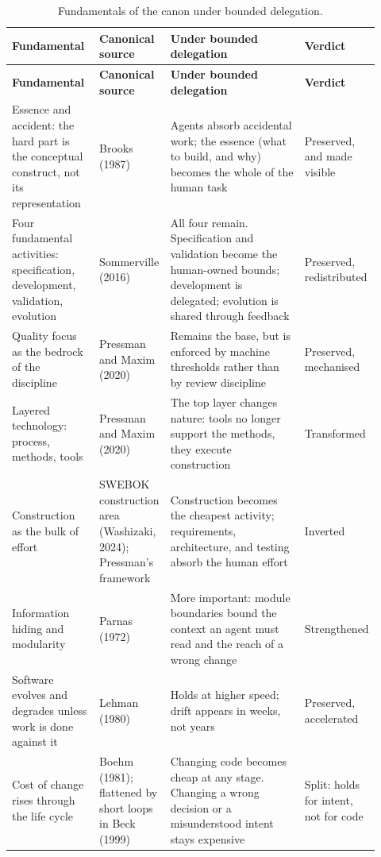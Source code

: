 \documentclass[11pt]{article}
\begin{document}
\small
\begin{longtable}{p{0.24\linewidth}p{0.17\linewidth}p{0.4\linewidth}p{0.11\linewidth}}
\caption{Fundamentals of the canon under bounded delegation.}
\label{tab:canon}\\
\toprule
\textbf{Fundamental} & \textbf{Canonical source} & \textbf{Under bounded delegation} & \textbf{Verdict} \\
\midrule
\endfirsthead
\toprule
\textbf{Fundamental} & \textbf{Canonical source} & \textbf{Under bounded delegation} & \textbf{Verdict} \\
\midrule
\endhead
Essence and accident: the hard part is the conceptual construct, not its representation & Brooks (1987) & Agents absorb accidental work; the essence (what to build, and why) becomes the whole of the human task & Preserved, and made visible \\
Four fundamental activities: specification, development, validation, evolution & Sommerville (2016) & All four remain. Specification and validation become the human-owned bounds; development is delegated; evolution is shared through feedback & Preserved, redistributed \\
Quality focus as the bedrock of the discipline & Pressman and Maxim (2020) & Remains the base, but is enforced by machine thresholds rather than by review discipline & Preserved, mechanised \\
Layered technology: process, methods, tools & Pressman and Maxim (2020) & The top layer changes nature: tools no longer support the methods, they execute construction & Transformed \\
Construction as the bulk of effort & SWEBOK construction area (Washizaki, 2024); Pressman's framework & Construction becomes the cheapest activity; requirements, architecture, and testing absorb the human effort & Inverted \\
Information hiding and modularity & Parnas (1972) & More important: module boundaries bound the context an agent must read and the reach of a wrong change & Strengthened \\
Software evolves and degrades unless work is done against it & Lehman (1980) & Holds at higher speed; drift appears in weeks, not years & Preserved, accelerated \\
Cost of change rises through the life cycle & Boehm (1981); flattened by short loops in Beck (1999) & Changing code becomes cheap at any stage. Changing a wrong decision or a misunderstood intent stays expensive & Split: holds for intent, not for code \\

\end{longtable}
\end{document}
